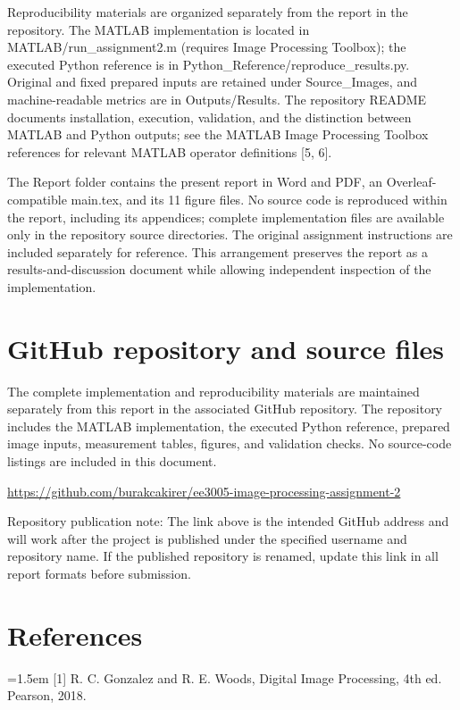 \documentclass[10pt,a4paper]{article}
\begin{document}
Reproducibility materials are organized separately from the report in the repository. The MATLAB implementation is located in MATLAB/run\_assignment2.m (requires Image Processing Toolbox); the executed Python reference is in Python\_Reference/reproduce\_results.py. Original and fixed prepared inputs are retained under Source\_Images, and machine-readable metrics are in Outputs/Results. The repository README documents installation, execution, validation, and the distinction between MATLAB and Python outputs; see the MATLAB Image Processing Toolbox references for relevant MATLAB operator definitions [5, 6].

The Report folder contains the present report in Word and PDF, an Overleaf-compatible main.tex, and its 11 figure files. No source code is reproduced within the report, including its appendices; complete implementation files are available only in the repository source directories. The original assignment instructions are included separately for reference. This arrangement preserves the report as a results-and-discussion document while allowing independent inspection of the implementation.

\section{GitHub repository and source files}
The complete implementation and reproducibility materials are maintained separately from this report in the associated GitHub repository. The repository includes the MATLAB implementation, the executed Python reference, prepared image inputs, measurement tables, figures, and validation checks. No source-code listings are included in this document.

\noindent\url{https://github.com/burakcakirer/ee3005-image-processing-assignment-2}

Repository publication note: The link above is the intended GitHub address and will work after the project is published under the specified username and repository name. If the published repository is renamed, update this link in all report formats before submission.

\clearpage
\section{References}
\noindent\hangindent=1.5em [1] R. C. Gonzalez and R. E. Woods, Digital Image Processing, 4th ed. Pearson, 2018.\par
\end{document}
